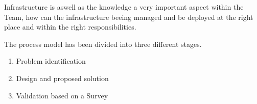 Infrastructure is aswell as the knowledge a very important aspect within the Team, how can the infrastructure beeing managed and be deployed at the right place and within the right responsibilities.

The process model has been divided into three different stages.

\begin{enumerate}
    \item Problem identification
    \item Design and proposed solution
    \item Validation based on a Survey
\end{enumerate}






